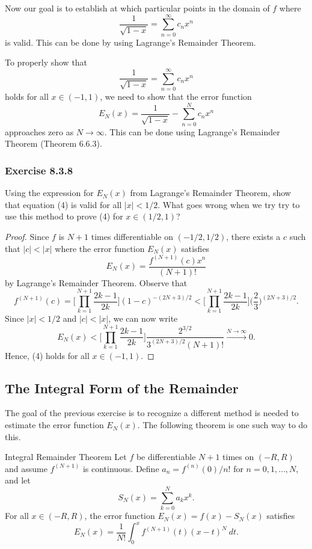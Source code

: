 Now our goal is to establish at which particular points in the domain of \( f  \) where 
\[  \frac{ 1 }{ \sqrt{ 1- x  }  }  = \sum_{ n=0 }^{ \infty  } c_{n} x^{n} \tag{4}  \] is valid. This can be done by using Lagrange's Remainder Theorem. 

To properly show that 
\[  \frac{ 1 }{ \sqrt{ 1-x  }  }  = \sum_{ n=0  }^{ \infty  } c_{n} x^{n}  \]
holds for all \( x \in (-1,1)  \), we need to show that the error function 
\[  E_{N}(x) = \frac{ 1 }{ \sqrt{ 1- x  }  }  - \sum_{ n=0  }^{ N  } c_{n } x^{ n} \]
approaches zero as \( N \to \infty  \). This can be done using Lagrange's Remainder Theorem (Theorem 6.6.3).


\subsubsection{Exercise 8.3.8} Using the expression for \( E_{N}(x)  \) from Lagrange's Remainder Theorem, show that equation (4) is valid for all \( | x  |  < 1 / 2  \). What goes wrong when we try try to use this method to prove (4) for \( x \in (1/2, 1 ) \)?
\begin{proof}
Since \( f  \) is \( N+1  \) times differentiable on \( (-1/2 , 1/ 2 ) \), there exists a \( c  \) such that \( |  c  |  < | x  |  \) where the error function \( E_{N}(x)  \) satisfies 
\[  E_{N}(x) = \frac{ f^{(N+1)}(c)  x^{n }  }{ (N+1)! } \] by Lagrange's Remainder Theorem. 
Observe that 
\[  f^{(N+1)}(c) = \Big[ \prod_{k=1}^{N+1} \frac{ 2k-1  }{ 2k }  \Big]   (1 -c )^{-(2N+3)/2} < \Big[ \prod_{k=1}^{N+1} \frac{ 2k-1  }{ 2k }  \Big]\Big( \frac{ 2 }{ 3 }  \Big)^{ (2N+3)/ 2}.\]
Since \( | x  |  < 1/ 2  \) and \( |  c  | < | x  |  \), we can now write
\[ E_{N}(x) < \Big[ \prod_{k=1}^{N+1} \frac{ 2k-1  }{ 2k }  \Big]\frac{  2^{3/2}}{  3^{(2N+3)/2} (N+1)! } \xrightarrow{N\rightarrow\infty} 0.   \]
Hence, (4) holds for all \( x \in (-1,1) \).
\end{proof}
\subsection{The Integral Form of the Remainder}

The goal of the previous exercise is to recognize a different method is needed to estimate the error function \( E_{N}(x)   \). The following theorem is one such way to do this.

\begin{theorem}{Integral Remainder Theorem}{}
    Let \( f  \) be differentiable \( N+1  \) times on \( (-R,R ) \) and assume \( f^{(N+1)}  \) is continuous. Define \( a_{n} = f^{(n)} (0) / n !   \) for \( n = 0,1 , \dots , N  \), and let 
    \[  S_{N}(x) = \sum_{ k=0 }^{ N   } a_{k } x^{k }.  \] For all \( x \in (-R ,R ) \), the error function \( E_{N}(x) = f(x) - S_{N}(x)   \) satisfies 
    \[  E_{N}(x) = \frac{ 1 }{ N! } \int_{ 0 }^{ x  }  f^{(N+1) }(t) (x-t)^{N} \  dt.  \]
    \end{theorem}

